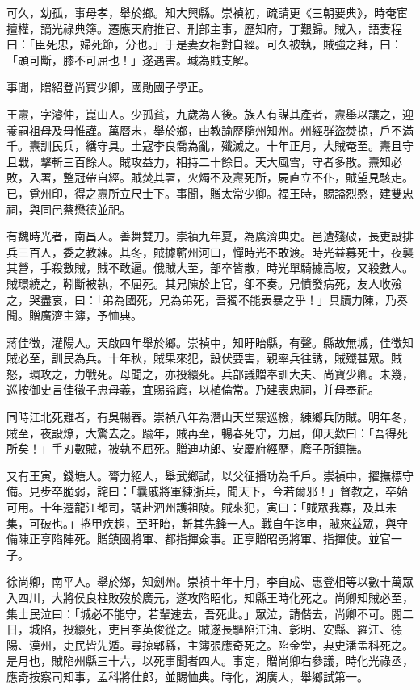 \begin{pinyinscope}
可久，幼孤，事母孝，舉於鄉。知大興縣。崇禎初，疏請更《三朝要典》，時奄宦擅權，謫光祿典簿。遷應天府推官、刑部主事，歷知府，丁艱歸。賊入，語妻程曰：「臣死忠，婦死節，分也。」于是妻女相對自經。可久被執，賊強之拜，曰：「頭可斷，膝不可屈也！」遂遇害。瑊為賊支解。

事聞，贈紹登尚寶少卿，國勛國子學正。

王燾，字濬仲，崑山人。少孤貧，九歲為人後。族人有謀其產者，燾舉以讓之，迎養嗣祖母及母惟謹。萬曆末，舉於鄉，由教諭歷隨州知州。州經群盜焚掠，戶不滿千。燾訓民兵，繕守具。土寇李良喬為亂，殲滅之。十年正月，大賊奄至。燾且守且戰，擊斬三百餘人。賊攻益力，相持二十餘日。天大風雪，守者多散。燾知必敗，入署，整冠帶自經。賊焚其署，火燭不及燾死所，屍直立不仆，賊望見駭走。已，覓州印，得之燾所立尺士下。事聞，贈太常少卿。福王時，賜謚烈愍，建雙忠祠，與同邑蔡懋德並祀。

有魏時光者，南昌人。善舞雙刀。崇禎九年夏，為廣濟典史。邑遭殘破，長吏設排兵三百人，委之教練。其冬，賊據蘄州河口，憚時光不敢渡。時光益募死士，夜襲其營，手殺數賊，賊不敢逼。俄賊大至，部卒皆散，時光單騎據高坡，又殺數人。賊環繞之，靷斷被執，不屈死。其兄陳於上官，卻不奏。兄憤發病死，友人收殮之，哭盡哀，曰：「弟為國死，兄為弟死，吾獨不能表暴之乎！」具牘力陳，乃奏聞。贈廣濟主簿，予恤典。

蔣佳徵，灌陽人。天啟四年舉於鄉。崇禎中，知盱眙縣，有聲。縣故無城，佳徵知賊必至，訓民為兵。十年秋，賊果來犯，設伏要害，親率兵往誘，賊殲甚眾。賊怒，環攻之，力戰死。母聞之，亦投繯死。兵部議贈奉訓大夫、尚寶少卿。未幾，巡按御史言佳徵子忠母義，宜賜謚廕，以植倫常。乃建表忠祠，并母奉祀。

同時江北死難者，有吳暢春。崇禎八年為潛山天堂寨巡檢，練鄉兵防賊。明年冬，賊至，夜設燎，大驚去之。踰年，賊再至，暢春死守，力屈，仰天歎曰：「吾得死所矣！」手刃數賊，被執不屈死。贈迪功郎、安慶府經歷，廕子所鎮撫。

又有王寅，錢塘人。膂力絕人，舉武鄉試，以父征播功為千戶。崇禎中，擢撫標守備。見步卒脆弱，詫曰：「曩戚將軍練浙兵，聞天下，今若爾邪！」督教之，卒始可用。十年遷龍江都司，調赴泗州護祖陵。賊來犯，寅曰：「賊眾我寡，及其未集，可破也。」捲甲疾趨，至盱眙，斬其先鋒一人。戰自午迄申，賊來益眾，與守備陳正亨陷陣死。贈鎮國將軍、都指揮僉事。正亨贈昭勇將軍、指揮使。並官一子。

徐尚卿，南平人。舉於鄉，知劍州。崇禎十年十月，李自成、惠登相等以數十萬眾入四川，大將侯良柱敗歿於廣元，遂攻陷昭化，知縣王時化死之。尚卿知賊必至，集士民泣曰：「城必不能守，若輩速去，吾死此。」眾泣，請偕去，尚卿不可。閱二日，城陷，投繯死，吏目李英俊從之。賊遂長驅陷江油、彰明、安縣、羅江、德陽、漢州，吏民皆先遁。尋掠郫縣，主簿張應奇死之。陷金堂，典史潘孟科死之。是月也，賊陷州縣三十六，以死事聞者四人。事定，贈尚卿右參議，時化光祿丞，應奇按察司知事，孟科將仕郎，並賜恤典。時化，湖廣人，舉鄉試第一。


\end{pinyinscope}
